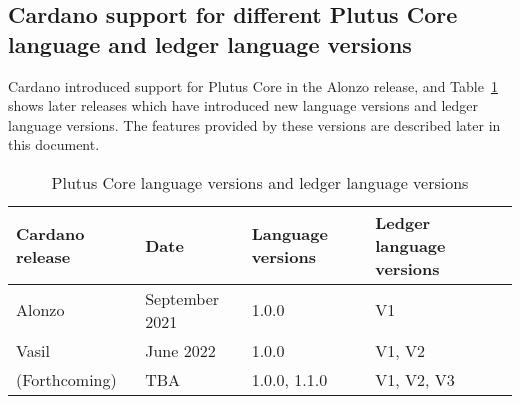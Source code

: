 \subsection{Cardano support for different Plutus Core language and ledger language versions}

Cardano introduced support for Plutus Core in the Alonzo release, and
Table~\ref{table:versions} shows later releases which have introduced new
language versions and ledger language versions.  The features provided by
these versions are described later in this document.
 
\begin{table}[H]
  \centering
    \begin{tabular}{|l|l|l|l|}
        \hline
        Cardano release & Date & Language versions & Ledger language versions \\
        \hline
        Alonzo & September 2021 & 1.0.0 & V1 \\
        Vasil & June 2022 & 1.0.0 & V1, V2 \\
        (Forthcoming) & TBA & 1.0.0, 1.1.0 & V1, V2, V3 \\
        \hline
    \end{tabular}
    \caption{Plutus Core language versions and ledger language versions}
    \label{table:versions}
\end{table}
   


